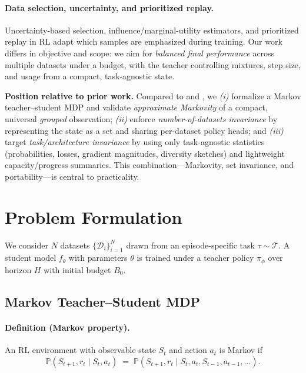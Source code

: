 \documentclass[11pt]{article}
\newcommand{\1}{\mathbf{1}}
\newcommand{\Prb}{\mathbb{P}}
\begin{document}
\paragraph{Data selection, uncertainty, and prioritized replay.} Uncertainty-based selection, influence/marginal-utility estimators, and prioritized replay in RL \citep{schaul2016prioritized} adapt which samples are emphasized during training. Our work differs in objective and scope: we aim for \emph{balanced final performance} across multiple datasets under a budget, with the teacher controlling mixtures, step size, and usage from a compact, task-agnostic state.

\medskip
\noindent\textbf{Position relative to prior work.} Compared to \citet{fan2018l2t} and \citet{wu2018l2tloss}, we \emph{(i)} formalize a Markov teacher--student MDP and validate \emph{approximate Markovity} of a compact, universal \emph{grouped} observation; \emph{(ii)} enforce \emph{number-of-datasets invariance} by representing the state as a set and sharing per-dataset policy heads; and \emph{(iii)} target \emph{task/architecture invariance} by using only task-agnostic statistics (probabilities, losses, gradient magnitudes, diversity sketches) and lightweight capacity/progress summaries. This combination---Markovity, set invariance, and portability---is central to practicality.


\section{Problem Formulation}
We consider $N$ datasets $\{\mathcal{D}_i\}_{i=1}^N$ drawn from an episode-specific task $\tau\sim\mathcal{T}$.
A student model $f_\theta$ with parameters $\theta$ is trained under a teacher policy $\pi_\phi$ over horizon $H$ with initial budget $B_0$.

\subsection{Markov Teacher--Student MDP}\label{sec:mdp}
\paragraph{Definition (Markov property).}
An RL environment with observable state $S_t$ and action $a_t$ is Markov if
\begin{equation}
\Prb(S_{t+1},r_t \mid S_t,a_t) \;=\; \Prb(S_{t+1},r_t \mid S_t,a_t,S_{t-1},a_{t-1},\dots).
\label{eq:markov}
\end{equation}
\end{document}
